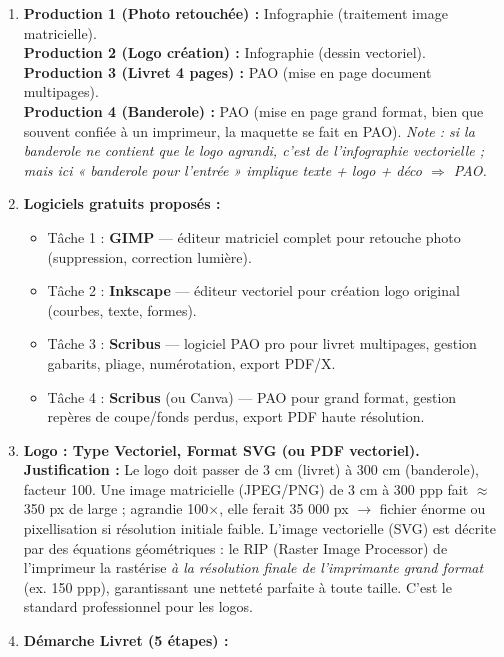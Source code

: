\documentclass[11pt]{article}
\newcommand{\cle}[1]{{\popxbold\color{popdark}#1}}
\begin{document}
\begin{corrige}
\begin{enumerate}
\item \textbf{Production 1 (Photo retouchée) :} \cle{Infographie} (traitement image matricielle). \\
\textbf{Production 2 (Logo création) :} \cle{Infographie} (dessin vectoriel). \\
\textbf{Production 3 (Livret 4 pages) :} \cle{PAO} (mise en page document multipages). \\
\textbf{Production 4 (Banderole) :} \cle{PAO} (mise en page grand format, bien que souvent confiée à un imprimeur, la maquette se fait en PAO). \textit{Note : si la banderole ne contient que le logo agrandi, c'est de l'infographie vectorielle ; mais ici « banderole pour l'entrée » implique texte + logo + déco $\Rightarrow$ PAO.}
\item \textbf{Logiciels gratuits proposés :}
\begin{itemize}
\item Tâche 1 : \textbf{GIMP} — éditeur matriciel complet pour retouche photo (suppression, correction lumière).
\item Tâche 2 : \textbf{Inkscape} — éditeur vectoriel pour création logo original (courbes, texte, formes).
\item Tâche 3 : \textbf{Scribus} — logiciel PAO pro pour livret multipages, gestion gabarits, pliage, numérotation, export PDF/X.
\item Tâche 4 : \textbf{Scribus} (ou Canva) — PAO pour grand format, gestion repères de coupe/fonds perdus, export PDF haute résolution.
\end{itemize}
\item \textbf{Logo : Type \cle{Vectoriel}, Format \cle{SVG} (ou PDF vectoriel).} \\
\textbf{Justification :} Le logo doit passer de 3 cm (livret) à 300 cm (banderole), facteur 100. Une image matricielle (JPEG/PNG) de 3 cm à 300 ppp fait $\approx$ 350 px de large ; agrandie 100$\times$, elle ferait 35 000 px $\rightarrow$ fichier énorme ou pixellisation si résolution initiale faible. L'image vectorielle (SVG) est décrite par des équations géométriques : le RIP (Raster Image Processor) de l'imprimeur la rastérise \emph{à la résolution finale de l'imprimante grand format} (ex. 150 ppp), garantissant une netteté parfaite à toute taille. C'est le standard professionnel pour les logos.
\item \textbf{Démarche Livret (5 étapes) :}

\end{enumerate}
\end{corrige}
\end{document}
